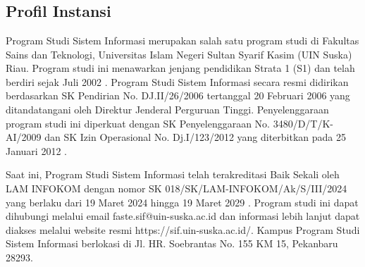%
%
%
%

\chapter{\babDua}


\section{Profil Instansi}
\thispagestyle{fancy} %
Program Studi Sistem Informasi merupakan salah satu program studi di Fakultas Sains dan Teknologi, Universitas Islam Negeri Sultan Syarif Kasim (UIN Suska) Riau. Program studi ini menawarkan jenjang pendidikan Strata 1 (S1) dan telah berdiri sejak Juli 2002 \cite{web-prodi}. Program Studi Sistem Informasi secara resmi didirikan berdasarkan SK Pendirian No. DJ.II/26/2006 tertanggal 20 Februari 2006 yang ditandatangani oleh Direktur Jenderal Perguruan Tinggi. Penyelenggaraan program studi ini diperkuat dengan SK Penyelenggaraan No. 3480/D/T/K-AI/2009 dan SK Izin Operasional No. Dj.I/123/2012 yang diterbitkan pada 25 Januari 2012 \cite{web-prodi}.

Saat ini, Program Studi Sistem Informasi telah terakreditasi Baik Sekali oleh LAM INFOKOM dengan nomor SK 018/SK/LAM-INFOKOM/Ak/S/III/2024 yang berlaku dari 19 Maret 2024 hingga 19 Maret 2029 \cite{web-prodi}. Program studi ini dapat dihubungi melalui email faste.sif@uin-suska.ac.id dan informasi lebih lanjut dapat diakses melalui website resmi https://sif.uin-suska.ac.id/. Kampus Program Studi Sistem Informasi berlokasi di Jl. HR. Soebrantas No. 155 KM 15, Pekanbaru 28293.
